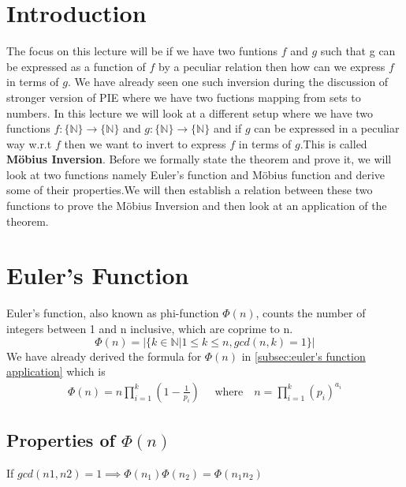 
\section{Introduction}
The focus on this lecture will be if we have two funtions $f$ and $g$ such that g can be expressed as a function of $f$ by a peculiar relation then how can we express $f$ in terms of $g$. We have already seen one such inversion during the discussion of stronger version of PIE where we have two fuctions mapping from sets to numbers. In this lecture we will look at a different setup where we have two functions $f:\{\mathbb{N} \} \to \{\mathbb{N}\}$ and $g:\{\mathbb{N} \} \to \{\mathbb{N} \}$ and if $g$ can be expressed in a peculiar way w.r.t $f$ then we want to invert to express $f$ in terms of $g$.This is called \textbf{Möbius Inversion}.
Before we formally state the theorem and prove it, we will look at two functions namely Euler's function and Möbius function and derive some of their properties.We will then establish a relation between these two functions to prove the Möbius Inversion and then look at an application of the theorem. 

\section{Euler's Function} \label{sec:Euler's Function}
Euler's function, also known as phi-function $\Phi(n)$, counts the number of integers between 1 and n inclusive, which are coprime to n. 
$$
\Phi(n) = |\{k \in \mathbb{N} | 1\leq k \leq n, gcd(n,k)=1\}| \label{fun:euler's}
$$ 
We have already derived the formula for $\Phi(n)$ in \ref{subsec:euler's function application} which is 
\begin{align}
\Phi(n) = n\prod_{i=1}^{k}(1-\frac{1}{p_i}) \textrm{ ~~~where~~  $n = \prod_{i=1}^{k}(p_i)^{a_i} $}\label{for:Euler's formula} 
\end{align}
\subsection{Properties of $\Phi(n)$} \label{subsec:Properties of Euler function}

\begin{property} 
If $gcd(n1,n2)=1 \implies \Phi(n_1)\Phi(n_2) = \Phi(n_1n_2) $  
\end{property} 

